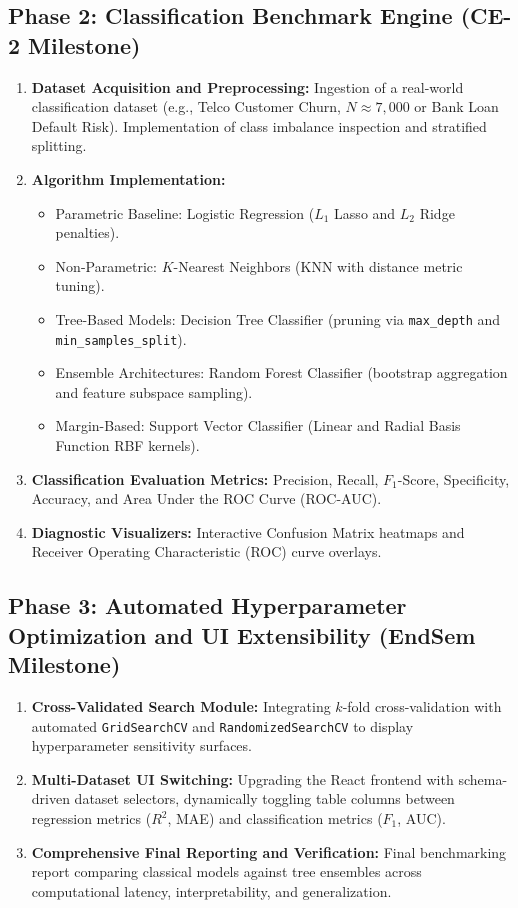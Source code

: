 \documentclass[11pt,a4paper]{article}
\begin{document}
\subsection{Phase 2: Classification Benchmark Engine (CE-2 Milestone)}
\begin{enumerate}[leftmargin=*,itemsep=1pt,topsep=2pt]
    \item \textbf{Dataset Acquisition and Preprocessing:} Ingestion of a real-world classification dataset (e.g., Telco Customer Churn, $N \approx 7,000$ or Bank Loan Default Risk). Implementation of class imbalance inspection and stratified splitting.
    \item \textbf{Algorithm Implementation:}
    \begin{itemize}[leftmargin=*,itemsep=1pt]
        \item Parametric Baseline: Logistic Regression ($L_1$ Lasso and $L_2$ Ridge penalties).
        \item Non-Parametric: $K$-Nearest Neighbors (KNN with distance metric tuning).
        \item Tree-Based Models: Decision Tree Classifier (pruning via \texttt{max\_depth} and \texttt{min\_samples\_split}).
        \item Ensemble Architectures: Random Forest Classifier (bootstrap aggregation and feature subspace sampling).
        \item Margin-Based: Support Vector Classifier (Linear and Radial Basis Function RBF kernels).
    \end{itemize}
    \item \textbf{Classification Evaluation Metrics:} Precision, Recall, $F_1$-Score, Specificity, Accuracy, and Area Under the ROC Curve (ROC-AUC).
    \item \textbf{Diagnostic Visualizers:} Interactive Confusion Matrix heatmaps and Receiver Operating Characteristic (ROC) curve overlays.
\end{enumerate}

\subsection{Phase 3: Automated Hyperparameter Optimization and UI Extensibility (EndSem Milestone)}
\begin{enumerate}[leftmargin=*,itemsep=1pt,topsep=2pt]
    \item \textbf{Cross-Validated Search Module:} Integrating $k$-fold cross-validation with automated \texttt{GridSearchCV} and \texttt{RandomizedSearchCV} to display hyperparameter sensitivity surfaces.
    \item \textbf{Multi-Dataset UI Switching:} Upgrading the React frontend with schema-driven dataset selectors, dynamically toggling table columns between regression metrics ($R^2$, MAE) and classification metrics ($F_1$, AUC).
    \item \textbf{Comprehensive Final Reporting and Verification:} Final benchmarking report comparing classical models against tree ensembles across computational latency, interpretability, and generalization.
\end{enumerate}
\end{document}
